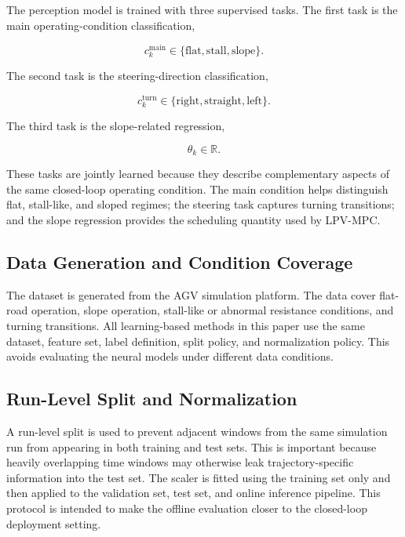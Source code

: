 \documentclass[twocolumn]{article}
\begin{document}
The perception model is trained with three supervised tasks. The first task is the main operating-condition classification,

\begin{equation}
c^{\mathrm{main}}_k \in \{\mathrm{flat}, \mathrm{stall}, \mathrm{slope}\}.
\label{eq:main_task}
\end{equation}

The second task is the steering-direction classification,

\begin{equation}
c^{\mathrm{turn}}_k \in \{\mathrm{right}, \mathrm{straight}, \mathrm{left}\}.
\label{eq:turn_task}
\end{equation}

The third task is the slope-related regression,

\begin{equation}
\theta_k \in \mathbb{R}.
\label{eq:theta_task}
\end{equation}

These tasks are jointly learned because they describe complementary aspects of the same closed-loop operating condition. The main condition helps distinguish flat, stall-like, and sloped regimes; the steering task captures turning transitions; and the slope regression provides the scheduling quantity used by LPV-MPC.

\subsection{Data Generation and Condition Coverage}

The dataset is generated from the AGV simulation platform. The data cover flat-road operation, slope operation, stall-like or abnormal resistance conditions, and turning transitions. All learning-based methods in this paper use the same dataset, feature set, label definition, split policy, and normalization policy. This avoids evaluating the neural models under different data conditions.

\subsection{Run-Level Split and Normalization}

A run-level split is used to prevent adjacent windows from the same simulation run from appearing in both training and test sets. This is important because heavily overlapping time windows may otherwise leak trajectory-specific information into the test set. The scaler is fitted using the training set only and then applied to the validation set, test set, and online inference pipeline. This protocol is intended to make the offline evaluation closer to the closed-loop deployment setting.
\end{document}
